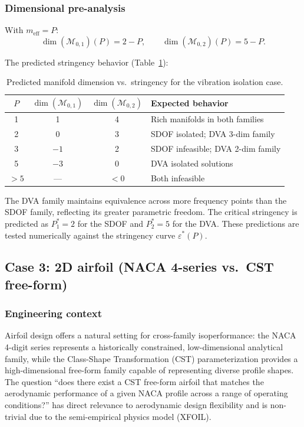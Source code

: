 \subsubsection{Dimensional pre-analysis}

With $m_{\mathrm{eff}} = P$:
\begin{equation}
    \dim(\mathcal{M}_{0,1})(P) = 2 - P, \qquad
    \dim(\mathcal{M}_{0,2})(P) = 5 - P.
\end{equation}

The predicted stringency behavior (Table~\ref{tab:vibration_dim}):

\begin{table}[h]
\centering
\caption{Predicted manifold dimension vs.\ stringency for the vibration isolation case.}
\label{tab:vibration_dim}
\small
\begin{tabular}{cccl}
\hline
$P$ & $\dim(\mathcal{M}_{0,1})$ & $\dim(\mathcal{M}_{0,2})$ & Expected behavior \\
\hline
1 & 1 & 4 & Rich manifolds in both families \\
2 & 0 & 3 & SDOF isolated; DVA 3-dim family \\
3 & $-1$ & 2 & SDOF infeasible; DVA 2-dim family \\
5 & $-3$ & 0 & DVA isolated solutions \\
$>5$ & --- & $<0$ & Both infeasible \\
\hline
\end{tabular}
\end{table}

The DVA family maintains equivalence across more frequency points than the SDOF family, reflecting its greater parametric freedom. The critical stringency is predicted as $P_1^* = 2$ for the SDOF and $P_2^* = 5$ for the DVA. These predictions are tested numerically against the stringency curve $\varepsilon^*(P)$.


\subsection{Case 3: 2D airfoil (NACA 4-series vs.\ CST free-form)}
\label{sec:case_airfoil}

\subsubsection{Engineering context}

Airfoil design offers a natural setting for cross-family isoperformance: the NACA 4-digit series represents a historically constrained, low-dimensional analytical family, while the Class-Shape Transformation (CST) parameterization provides a high-dimensional free-form family capable of representing diverse profile shapes. The question ``does there exist a CST free-form airfoil that matches the aerodynamic performance of a given NACA profile across a range of operating conditions?'' has direct relevance to aerodynamic design flexibility and is non-trivial due to the semi-empirical physics model (XFOIL).


